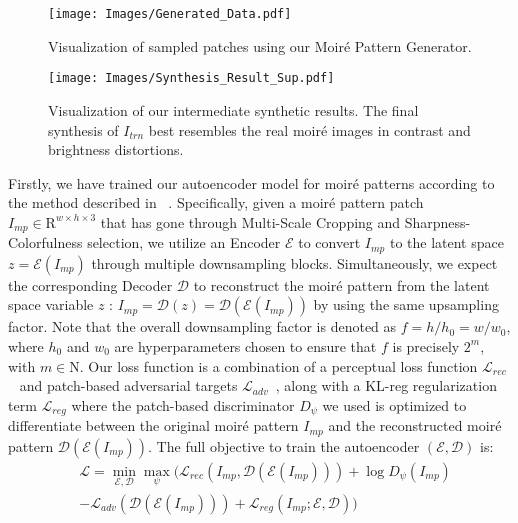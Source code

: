 \begin{figure*}[!p]
  \centering
    \texttt{[image: Images/Generated\_Data.pdf]}
  \caption{Visualization of sampled patches using our Moiré Pattern Generator.}
  \label{fig:generated_data}
\end{figure*}

\begin{figure*}[!t]
  \centering
    \texttt{[image: Images/Synthesis\_Result\_Sup.pdf]}
  \caption{Visualization of our intermediate synthetic results. The final synthesis of $I_{trn}$ best resembles the real moiré images in contrast and brightness distortions.} 
  \label{fig:synthesis_result_sup}
\end{figure*}

Firstly, we have trained our autoencoder model for moiré patterns according to the method described in ~\cite{Rombach2022LDM}.
Specifically, given a moiré pattern patch $I_{mp} \in \mathrm{R}^{w \times h \times 3}$ that has gone through Multi-Scale Cropping and Sharpness-Colorfulness selection, we utilize an Encoder $\mathcal{E}$ to convert $I_{mp}$ to the latent space $z=\mathcal{E}(I _{mp})$ through multiple downsampling blocks. Simultaneously, we expect the corresponding Decoder $\mathcal{D}$ to reconstruct the moiré pattern from the latent space variable $z$ : $I_{mp}=\mathcal{D}(z)=\mathcal{D}(\mathcal{E}(I_{mp}))$ by using the same upsampling factor. Note that the overall downsampling factor is denoted as $f=h/h_0=w/w_0$, where  $h_0$ and $w_0$  are hyperparameters chosen to ensure that $f$ is precisely $2^m$, with $m \in \mathrm{N}$.
Our loss function is a combination of a perceptual loss function $\mathcal{L}_{rec}$~\cite{zhang2018unreasonable} and patch-based adversarial targets $\mathcal{L}_{adv}$~\cite{Dosovitskiy2016Generating, Esser2021Taming, Yu2021Vector}, along with a KL-reg regularization term $\mathcal{L}_{reg}$ where the patch-based discriminator $D_{\psi}$ we used is optimized to differentiate between the original moiré pattern $I_{mp}$ and the reconstructed moiré pattern $\mathcal{D}(\mathcal{E}(I_{mp}))$. 
The full objective to train the autoencoder $(\mathcal{E},\mathcal{D})$ is:
\begin{equation}
\begin{split}
&\mathcal{L}=\min_{\mathcal{E}, \mathcal{D}} \max_{\psi}(\mathcal{L}_{rec}(I_{mp}, \mathcal{D}(\mathcal{E}(I_{mp})))+\log D_\psi(I_{mp}) \\
&-\mathcal{L}_{adv}(\mathcal{D}(\mathcal{E}(I_{mp})))+\mathcal{L}_{reg}(I_{mp} ; \mathcal{E}, \mathcal{D}))
\end{split}
\end{equation}

